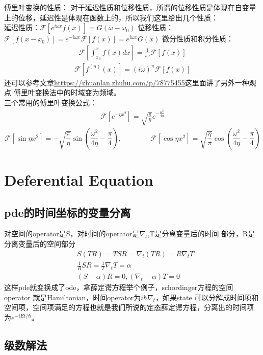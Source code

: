 \documentclass[UTF8]{article}
\begin{document}
傅里叶变换的性质：
对于延迟性质和位移性质，所谓的位移性质是体现在自变量上的位移，延迟性是体现在函数上的，所以我们这里给出几个性质：\\
延迟性质：$\mathcal{F}\left[e^{i\omega x}f(x)\right]=G(\omega-\omega_0)$
位移性质：$\mathcal{F}\left[f(x-x_0)\right]=e^{-i \omega x}\mathcal{F}\left[f(x)\right]=e^{i\omega x}G(x)$
微分性质和积分性质：
\begin{align*}
	\mathcal{F}\left[\int_{x_0}^{x}f(x)dx\right]=\frac{1}{i\omega}\mathcal{F}[f(x)]
\end{align*}
\begin{align*}
	\mathcal{F}\left[f^{(n)}(x)\right]=(i\omega)^{n}\mathcal{F}\left[f(x)\right]
\end{align*}
还可以参考文章\href{https://zhuanlan.zhihu.com/p/78775455}{htttps://zhuanlan.zhuhu.com/p/78775455}这里面讲了另外一种观点
傅里叶变换法中的时域变为频域。\\
三个常用的傅里叶变换公式：
\begin{align*}
	\mathcal{F}\left[e^{-\eta x^2}\right]=\sqrt{\frac{\pi}{\eta}}e^{-\frac{\omega^2}{4\eta}}
\end{align*}
\begin{equation*}
	\mathcal{F}\left[\sin \eta x^2\right]=-\sqrt{\frac{\pi}{\eta}}\sin\left(\frac{\omega^2}{4\eta}-\frac{\pi}{4}\right),\qquad\qquad\mathcal{F}\left[\cos \eta x^2\right]=\sqrt{\frac{\eta }{\pi}}\cos\left(\frac{\omega^2}{4\eta}-\frac{\pi}{4}\right)
\end{equation*}

\section{Deferential Equation}
\subsection{pde的时间坐标的变量分离}
对空间的operator是S，对时间的operator是$\nabla_t$,T是分离变量后的时间
部分，R是分离变量后的空间部分
\begin{align*}
	&S(TR)=TSR=\nabla_t(TR)=R\nabla_t T\\
	&\frac{1}{R}SR=\frac{1}{T}\nabla_t T=\alpha\\
	&(S-\alpha)R=0,(\nabla_t-\alpha)T=0
\end{align*}
这样pde就变换成了ode，拿薛定谔方程举个例子，schordinger方程的空间
operator 就是Hamiltonian，时间operator为$i\hbar\nabla_t$，如果state
可以分解成时间项和空间项，空间项满足的方程也就是我们所说的定态薛定谔方程，分离出的时间项
为$e^{-iEt/\hbar}$。
\subsection{级数解法}
\end{document}
